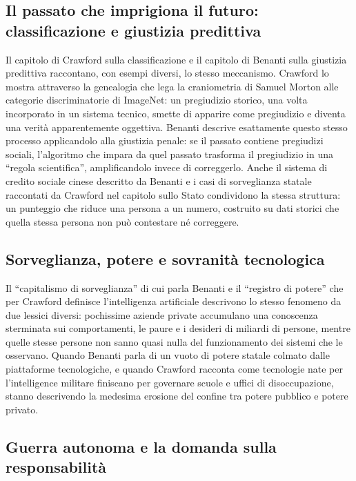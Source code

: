 \documentclass[a4paper,11pt]{article}
\begin{document}
\subsection{Il passato che imprigiona il futuro: classificazione e giustizia predittiva}

Il capitolo di Crawford sulla classificazione e il capitolo di Benanti sulla giustizia predittiva raccontano, con esempi diversi, lo stesso meccanismo. Crawford lo mostra attraverso la genealogia che lega la craniometria di Samuel Morton alle categorie discriminatorie di ImageNet: un pregiudizio storico, una volta incorporato in un sistema tecnico, smette di apparire come pregiudizio e diventa una verità apparentemente oggettiva. Benanti descrive esattamente questo stesso processo applicandolo alla giustizia penale: se il passato contiene pregiudizi sociali, l'algoritmo che impara da quel passato trasforma il pregiudizio in una ``regola scientifica'', amplificandolo invece di correggerlo. Anche il sistema di credito sociale cinese descritto da Benanti e i casi di sorveglianza statale raccontati da Crawford nel capitolo sullo Stato condividono la stessa struttura: un punteggio che riduce una persona a un numero, costruito su dati storici che quella stessa persona non può contestare né correggere.

\subsection{Sorveglianza, potere e sovranità tecnologica}

Il ``capitalismo di sorveglianza'' di cui parla Benanti e il ``registro di potere'' che per Crawford definisce l'intelligenza artificiale descrivono lo stesso fenomeno da due lessici diversi: pochissime aziende private accumulano una conoscenza sterminata sui comportamenti, le paure e i desideri di miliardi di persone, mentre quelle stesse persone non sanno quasi nulla del funzionamento dei sistemi che le osservano. Quando Benanti parla di un vuoto di potere statale colmato dalle piattaforme tecnologiche, e quando Crawford racconta come tecnologie nate per l'intelligence militare finiscano per governare scuole e uffici di disoccupazione, stanno descrivendo la medesima erosione del confine tra potere pubblico e potere privato.

\subsection{Guerra autonoma e la domanda sulla responsabilità}
\end{document}
